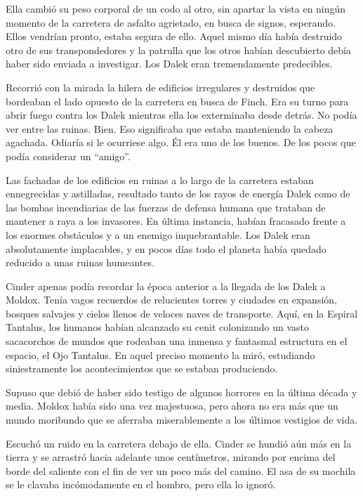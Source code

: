 Ella cambió su peso corporal de un codo al otro, sin apartar la vista en ningún momento de la carretera de asfalto agrietado, en busca de signos, esperando. Ellos vendrían pronto, estaba segura de ello. Aquel mismo día había destruido otro de sus transpondedores y la patrulla que los otros habían descubierto debía haber sido enviada a investigar. Los Dalek eran tremendamente predecibles.

Recorrió con la mirada la hilera de edificios irregulares y destruidos que bordeaban el lado opuesto de la carretera en busca de Finch. Era su turno para abrir fuego contra los Dalek mientras ella los exterminaba desde detrás. No podía ver entre las ruinas. Bien. Eso significaba que estaba manteniendo la cabeza agachada. Odiaría si le ocurriese algo. Él era uno de los buenos. De los pocos que podía considerar un ``amigo''.

Las fachadas de los edificios en ruinas a lo largo de la carretera estaban ennegrecidas y astilladas, resultado tanto de los rayos de energía Dalek como de las bombas incendiarias de las fuerzas de defensa humana que trataban de mantener a raya a los invasores. En última instancia, habían fracasado frente a los enormes obstáculos y a un enemigo inquebrantable. Los Dalek eran absolutamente implacables, y en pocos días todo el planeta había quedado reducido a unas ruinas humeantes.

Cinder apenas podía recordar la época anterior a la llegada de los Dalek a Moldox. Tenía vagos recuerdos de relucientes torres y ciudades en expansión, bosques salvajes y cielos llenos de veloces naves de transporte. Aquí, en la Espiral Tantalus, los humanos habían alcanzado su cenit colonizando un vasto sacacorchos de mundos que rodeaban una inmensa y fantasmal estructura en el espacio, el Ojo Tantalus. En aquel preciso momento la miró, estudiando siniestramente los acontecimientos que se estaban produciendo.

Supuso que debió de haber sido testigo de algunos horrores en la última década y media. Moldox había sido una vez majestuosa, pero ahora no era más que un mundo moribundo que se aferraba miserablemente a los últimos vestigios de vida.

Escuchó un ruido en la carretera debajo de ella. Cinder se hundió aún más en la tierra y se arrastró hacia adelante unos centímetros, mirando por encima del borde del saliente con el fin de ver un poco más del camino. El asa de su mochila se le clavaba incómodamente en el hombro, pero ella lo ignoró.

